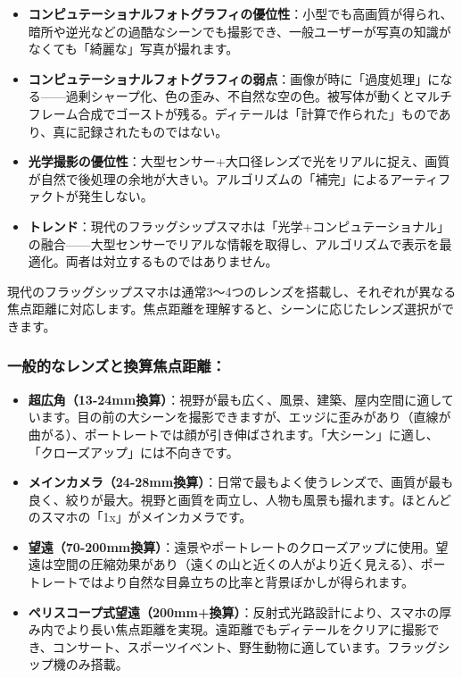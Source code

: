 \begin{itemize}
  \item \textbf{コンピュテーショナルフォトグラフィの優位性}：小型でも高画質が得られ、暗所や逆光などの過酷なシーンでも撮影でき、一般ユーザーが写真の知識がなくても「綺麗な」写真が撮れます。
  \item \textbf{コンピュテーショナルフォトグラフィの弱点}：画像が時に「過度処理」になる——過剰シャープ化、色の歪み、不自然な空の色。被写体が動くとマルチフレーム合成でゴーストが残る。ディテールは「計算で作られた」ものであり、真に記録されたものではない。
  \item \textbf{光学撮影の優位性}：大型センサー+大口径レンズで光をリアルに捉え、画質が自然で後処理の余地が大きい。アルゴリズムの「補完」によるアーティファクトが発生しない。
  \item \textbf{トレンド}：現代のフラッグシップスマホは「光学+コンピュテーショナル」の融合——大型センサーでリアルな情報を取得し、アルゴリズムで表示を最適化。両者は対立するものではありません。
\end{itemize}


現代のフラッグシップスマホは通常3〜4つのレンズを搭載し、それぞれが異なる焦点距離に対応します。焦点距離を理解すると、シーンに応じたレンズ選択ができます。

\subsubsection*{一般的なレンズと換算焦点距離：}

\begin{itemize}
  \item \textbf{超広角（13-24mm換算）}：視野が最も広く、風景、建築、屋内空間に適しています。目の前の大シーンを撮影できますが、エッジに歪みがあり（直線が曲がる）、ポートレートでは顔が引き伸ばされます。「大シーン」に適し、「クローズアップ」には不向きです。
  \item \textbf{メインカメラ（24-28mm換算）}：日常で最もよく使うレンズで、画質が最も良く、絞りが最大。視野と画質を両立し、人物も風景も撮れます。ほとんどのスマホの「1x」がメインカメラです。
  \item \textbf{望遠（70-200mm換算）}：遠景やポートレートのクローズアップに使用。望遠は空間の圧縮効果があり（遠くの山と近くの人がより近く見える）、ポートレートではより自然な目鼻立ちの比率と背景ぼかしが得られます。
  \item \textbf{ペリスコープ式望遠（200mm+換算）}：反射式光路設計により、スマホの厚み内でより長い焦点距離を実現。遠距離でもディテールをクリアに撮影でき、コンサート、スポーツイベント、野生動物に適しています。フラッグシップ機のみ搭載。
\end{itemize}

